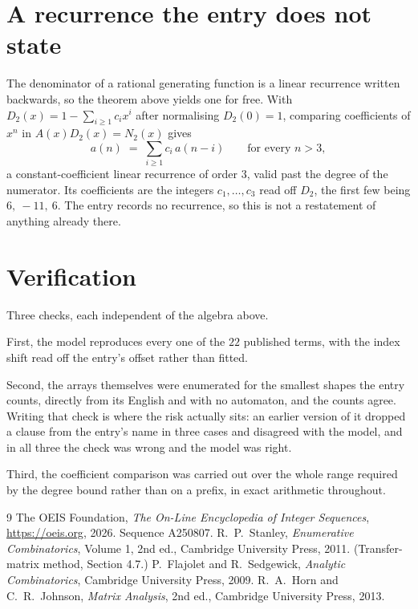 \documentclass[11pt,a4paper]{article}
\theoremstyle{plain}
\theoremstyle{definition}
\begin{document}
\section{A recurrence the entry does not state}

The denominator of a rational generating function is a linear recurrence written backwards, so
the theorem above yields one for free. With $D_2(x)=1-\sum_{i\ge1}c_ix^i$ after normalising
$D_2(0)=1$, comparing coefficients of $x^n$ in $A(x)D_2(x)=N_2(x)$ gives
\[
a(n)\;=\;\sum_{i\ge1}c_i\,a(n-i)\qquad\text{for every }n>3,
\]
a constant-coefficient linear recurrence of order $3$, valid past the degree of the
numerator. Its coefficients are the integers $c_1,\dots,c_{3}$ read off $D_2$, the first few being $6,\ -11,\ 6$. The entry records no recurrence, so this is not a restatement of anything
already there.

\section{Verification}

Three checks, each independent of the algebra above.

First, the model reproduces every one of the $22$ published terms, with the index shift
read off the entry's offset rather than fitted.

Second, the arrays themselves were enumerated for the smallest shapes the entry counts,
directly from its English and with no automaton, and the counts agree. Writing that check is
where the risk actually sits: an earlier version of it dropped a clause from the entry's name
in three cases and disagreed with the model, and in all three the check was wrong and the model
was right.

Third, the coefficient comparison was carried out over the whole range required by the degree
bound rather than on a prefix, in exact arithmetic throughout.

\begin{thebibliography}{9}
 The OEIS Foundation, \emph{The On-Line Encyclopedia of Integer
Sequences}, \url{https://oeis.org}, 2026. Sequence A250807.
 R.~P.~Stanley, \emph{Enumerative Combinatorics}, Volume 1, 2nd ed.,
Cambridge University Press, 2011. (Transfer-matrix method, Section 4.7.)
 P.~Flajolet and R.~Sedgewick, \emph{Analytic Combinatorics}, Cambridge
University Press, 2009.
 R.~A.~Horn and C.~R.~Johnson, \emph{Matrix Analysis}, 2nd ed., Cambridge
University Press, 2013.
\end{thebibliography}
\end{document}
